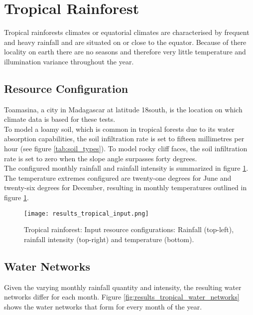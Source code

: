 \section{Tropical Rainforest}

Tropical rainforests climates or equatorial climates are characterised by frequent and heavy rainfall and are situated on or close to the equator. Because of there locality on earth there are no seasons and therefore very little temperature and illumination variance throughout the year.\\

\subsection{Resource Configuration}

Toamasina, a city in Madagascar at latitude 18\textdegree south, is the location on which climate data is based for these tests.\\

To model a loamy soil, which is common in tropical forests due to its water absorption capabilities, the soil infiltration rate is set to fifteen millimetres per hour (see figure \ref{tab:soil_types}). To model rocky cliff faces, the soil infiltration rate is set to zero when the slope angle surpasses forty degrees.\\

The configured monthly rainfall and rainfall intensity is summarized in figure \ref{fig:results_tropical_input}.\\

The temperature extremes configured are twenty-one degrees for June and twenty-six degrees for December, resulting in monthly temperatures outlined in figure \ref{fig:results_tropical_input}.\\

\begin{figure}
\center
	\texttt{[image: results\_tropical\_input.png]}
	\caption{ Tropical rainforest: Input resource configurations: Rainfall (top-left), rainfall intensity (top-right) and temperature (bottom).}
	\label{fig:results_tropical_input}
\end{figure}

\subsection{Water Networks}

Given the varying monthly rainfall quantity and intensity, the resulting water networks differ for each month. Figure \ref{fig:results_tropical_water_networks} shows the water networks that form for every month of the year.

